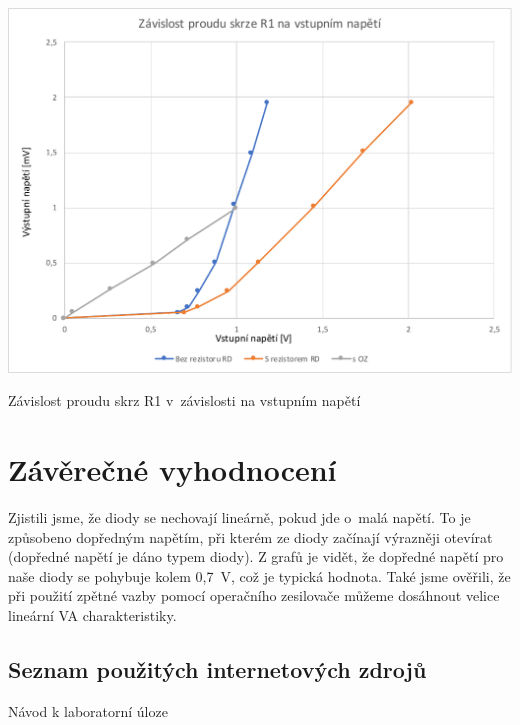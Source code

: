 \documentclass[a4paper,12pt]{article}   %
\begin{document}
\begin{graf}[h!]
    \centering
    \includegraphics[width=.7\textwidth]{proud.pdf}
    \caption{Závislost proudu skrz R1 v~závislosti na vstupním napětí}
\end{graf}

\section{Závěrečné vyhodnocení}
Zjistili jsme, že diody se nechovají lineárně, pokud jde o~malá napětí. To je způsobeno dopředným napětím, při kterém ze diody začínají výrazněji otevírat (dopředné napětí je dáno typem diody). Z grafů je vidět, že dopředné napětí pro naše diody se pohybuje kolem 0,7~V, což je typická hodnota. Také jsme ověřili, že při použití zpětné vazby pomocí operačního zesilovače můžeme dosáhnout velice lineární VA charakteristiky.


\clearpage
\renewcommand{\refname}{Seznam použité literatury a~zdrojů informací} 

\begin{thebibliography}{99}

\subsection*{Seznam použitých internetových zdrojů}
     Návod k laboratorní úloze
    
\end{thebibliography}
\end{document}
